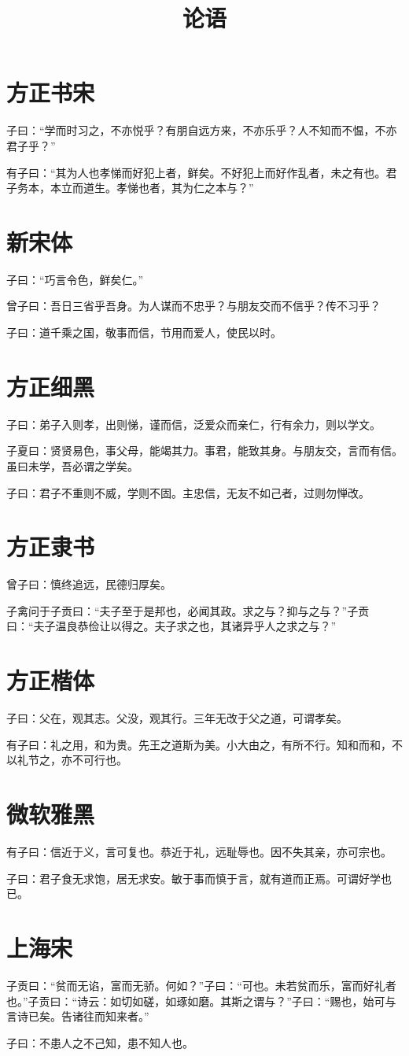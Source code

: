 \documentclass[10pt,letterpaper]{article}
\title{论语} \author{} \date{}
\begin{document}
\section{方正书宋}

    子曰：“学而时习之，不亦悦乎？有朋自远方来，不亦乐乎？人不知而不愠，不亦君子乎？”

    有子曰：“其为人也孝悌而好犯上者，鲜矣。不好犯上而好作乱者，未之有也。君子务本，本立而道生。孝悌也者，其为仁之本与？”

\section{新宋体}
    子曰：“巧言令色，鲜矣仁。”

    曾子曰：吾日三省乎吾身。为人谋而不忠乎？与朋友交而不信乎？传不习乎？

    子曰：道千乘之国，敬事而信，节用而爱人，使民以时。

\section{方正细黑}

    子曰：弟子入则孝，出则悌，谨而信，泛爱众而亲仁，行有余力，则以学文。

    子夏曰：贤贤易色，事父母，能竭其力。事君，能致其身。与朋友交，言而有信。虽曰未学，吾必谓之学矣。

    子曰：君子不重则不威，学则不固。主忠信，无友不如己者，过则勿惮改。

\section{方正隶书}

    曾子曰：慎终追远，民德归厚矣。

    子禽问于子贡曰：“夫子至于是邦也，必闻其政。求之与？抑与之与？”子贡曰：“夫子温良恭俭让以得之。夫子求之也，其诸异乎人之求之与？”

\section{方正楷体}

    子曰：父在，观其志。父没，观其行。三年无改于父之道，可谓孝矣。

    有子曰：礼之用，和为贵。先王之道斯为美。小大由之，有所不行。知和而和，不以礼节之，亦不可行也。

\section{微软雅黑}

    有子曰：信近于义，言可复也。恭近于礼，远耻辱也。因不失其亲，亦可宗也。

    子曰：君子食无求饱，居无求安。敏于事而慎于言，就有道而正焉。可谓好学也已。

\section{上海宋}

    子贡曰：“贫而无谄，富而无骄。何如？”子曰：“可也。未若贫而乐，富而好礼者也。”子贡曰：“诗云：如切如磋，如琢如磨。其斯之谓与？”子曰：“赐也，始可与言诗已矣。告诸往而知来者。”

    子曰：不患人之不己知，患不知人也。
\end{document}
